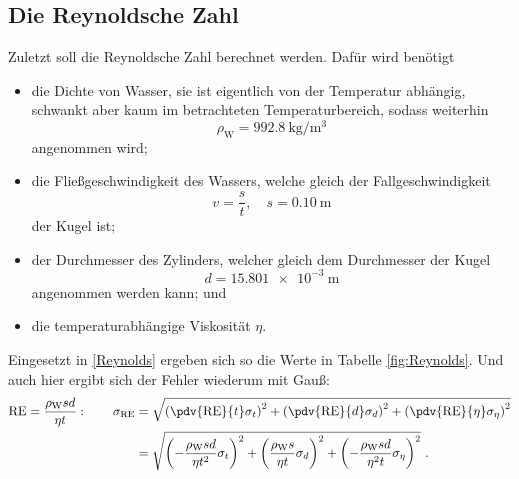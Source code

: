 \subsection{Die Reynoldsche Zahl}
Zuletzt soll die Reynoldsche Zahl berechnet werden. Dafür wird benötigt
\begin{itemize}
	\item die Dichte von Wasser, sie ist eigentlich von der Temperatur abhängig, schwankt aber kaum im betrachteten Temperaturbereich, sodass weiterhin \[ \rho_\text{W}=\SI{992.8}{\kilo\gram\per\metre\cubed} \] angenommen wird;
	\item die Fließgeschwindigkeit des Wassers, welche gleich der Fallgeschwindigkeit
	\[ v = \frac{s}{t}, \quad s=\SI{0.10}{\metre} \] der Kugel ist;
	\item der Durchmesser des Zylinders, welcher gleich dem Durchmesser der Kugel \[ d = \SI{15.801e-3}{\metre} \] angenommen werden kann; und
	\item die temperaturabhängige Viskosität $\eta$.
\end{itemize}
Eingesetzt in \eqref{Reynolds} ergeben sich so die Werte in Tabelle \ref{fig:Reynolds}. Und auch hier ergibt sich der Fehler wiederum mit Gauß:
\begin{align}
	\text{RE} = \frac{\rho_\text{W} s d}{\eta t}: \qquad \sigma_{\text{RE}} &= \sqrt{\left(\pdv{\text{RE}}{t}\sigma_t\right)^2+\left(\pdv{\text{RE}}{d}\sigma_d\right)^2+\left(\pdv{\text{RE}}{\eta}\sigma_\eta\right)^2} \\
	&= \sqrt{\left(-\frac{\rho_\text{W}sd}{\eta t^2}\sigma_t\right)^2+\left(\frac{\rho_\text{W}s}{\eta t}\sigma_d\right)^2+\left(-\frac{\rho_\text{W}sd}{\eta^2 t}\sigma_\eta\right)^2} \ .
\end{align}
